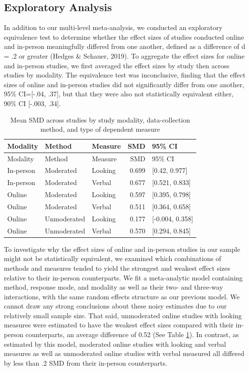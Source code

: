 \documentclass[
  man,floatsintext]{apa6}
\begin{document}
\hypertarget{exploratory-analysis}{%
\subsection{Exploratory Analysis}\label{exploratory-analysis}}

In addition to our multi-level meta-analysis, we conducted an exploratory equivalence test to determine whether the effect sizes of studies conducted online and in-person meaningfully differed from one another, defined as a difference of d = .2 or greater (Hedges \& Schauer, 2019). To aggregate the effect sizes for online and in-person studies, we first averaged the effect sizes by study then across studies by modality. The equivalence test was inconclusive, finding that the effect sizes of online and in-person studies did not significantly differ from one another, 95\% CI={[}-.04, .37{]}, but that they were also not statistically equivalent either, 90\% CI {[}-.003, .34{]}.

\begin{longtable}[]{@{}lllrl@{}}
\caption{\label{tab:modmeans}Mean SMD across studies by study modality, data-collection method, and type of dependent measure}\tabularnewline
\toprule()
Modality & Method & Measure & SMD & 95\% CI \\
\midrule()
\endfirsthead
\toprule()
Modality & Method & Measure & SMD & 95\% CI \\
\midrule()
\endhead
In-person & Moderated & Looking & 0.699 & {[}0.42, 0.977{]} \\
In-person & Moderated & Verbal & 0.677 & {[}0.521, 0.833{]} \\
Online & Moderated & Looking & 0.597 & {[}0.395, 0.798{]} \\
Online & Moderated & Verbal & 0.511 & {[}0.364, 0.658{]} \\
Online & Unmoderated & Looking & 0.177 & {[}-0.004, 0.358{]} \\
Online & Unmoderated & Verbal & 0.570 & {[}0.294, 0.845{]} \\
\bottomrule()
\end{longtable}

To investigate why the effect sizes of online and in-person studies in our sample might not be statistically equivalent, we examined which combinations of methods and measures tended to yield the strongest and weakest effect sizes relative to their in-person counterparts. We fit a meta-analytic model containing method, response mode, and modality as well as their two- and three-way interactions, with the same random effects structure as our previous model. We cannot draw any strong conclusions about these noisy estimates due to our relatively small sample size. That said, unmoderated online studies with looking measures were estimated to have the weakest effect sizes compared with their in-person counterparts, an average difference of 0.52 (See Table \ref{tab:modmeans}). In contrast, as estimated by this model, moderated online studies with looking and verbal measures as well as unmoderated online studies with verbal measured all differed by less than .2 SMD from their in-person counterparts.
\end{document}
